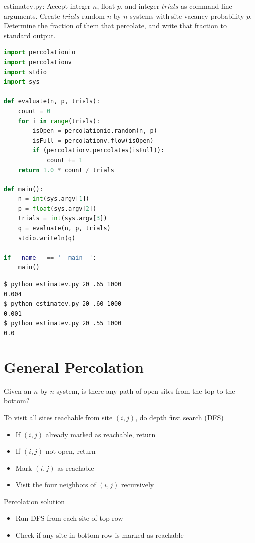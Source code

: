 \documentclass[8pt,a4paper,compress]{beamer}
\begin{document}
\begin{frame}[fragile]
\pause

\begin{framed}
\tiny estimatev.py: Accept integer $n$, float $p$, and integer $trials$ as command-line arguments. Create $trials$ random $n$-by-$n$ systems with site vacancy probability $p$. Determine the fraction of them that percolate, and
write that fraction to standard output.
\end{framed}

\begin{lstlisting}[language=Python]
import percolationio
import percolationv
import stdio
import sys

def evaluate(n, p, trials):
    count = 0
    for i in range(trials):
        isOpen = percolationio.random(n, p)
        isFull = percolationv.flow(isOpen)
        if (percolationv.percolates(isFull)):
            count += 1
    return 1.0 * count / trials

def main():
    n = int(sys.argv[1])
    p = float(sys.argv[2])
    trials = int(sys.argv[3])
    q = evaluate(n, p, trials)
    stdio.writeln(q)
    
if __name__ == '__main__': 
    main()
\end{lstlisting}

\pause

\begin{lstlisting}[language={}]
$ python estimatev.py 20 .65 1000
0.004
$ python estimatev.py 20 .60 1000
0.001
$ python estimatev.py 20 .55 1000
0.0
\end{lstlisting}
\end{frame}

\section{General Percolation}
\begin{frame}[fragile]
\pause

Given an $n$-by-$n$ system, is there any path of open sites from the top to the bottom?

\pause
\bigskip

To visit all sites reachable from site $(i, j)$, do depth first search (DFS)
\begin{itemize}
\item If $(i, j)$ already marked as reachable, return
\item If $(i, j)$ not open, return
\item Mark $(i, j)$ as reachable
\item Visit the four neighbors of $(i, j)$ recursively
\end{itemize}

\pause
\bigskip

Percolation solution
\begin{itemize}
\item Run DFS from each site of top row
\item Check if any site in bottom row is marked as reachable
\end{itemize}
\end{frame}
\end{document}
